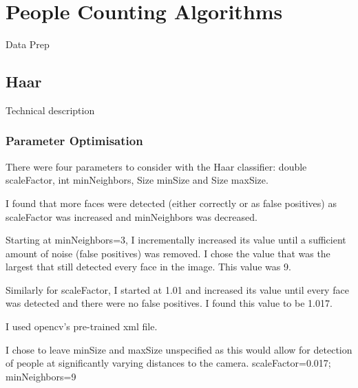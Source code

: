 \documentclass{article}
\begin{document}
\section{People Counting Algorithms}
Data Prep

\subsection{Haar}
Technical description
\subsubsection{Parameter Optimisation}
There were four parameters to consider with the Haar classifier: double scaleFactor, int minNeighbors, Size minSize and Size maxSize.

I found that more faces were detected (either correctly or as false positives) as scaleFactor was increased and minNeighbors was decreased.

Starting at minNeighbors=3, I incrementally increased its value until a sufficient amount of noise (false positives) was removed. I chose the value that was the largest that still detected every face in the image. This value was 9.

Similarly for scaleFactor, I started at 1.01 and increased its value until every face was detected and there were no false positives. I found this value to be 1.017. 

I used opencv's pre-trained xml file.

I chose to leave minSize and maxSize unspecified as this would allow for detection of people at significantly varying distances to the camera.
scaleFactor=0.017; minNeighbors=9
\end{document}
